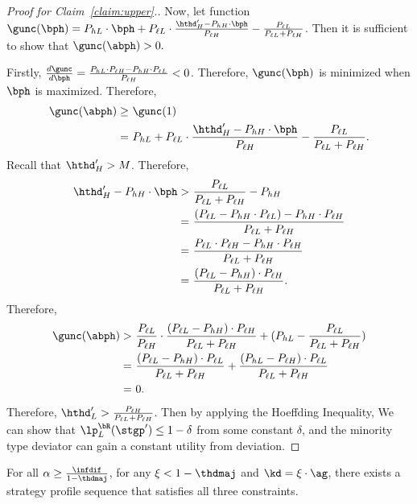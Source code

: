 \begin{proof}[Proof for Claim~\ref{claim:upper}.]
    Now, let function $\gunc(\bph) = P_{hL} \cdot \bph + P_{\ell L}\cdot \frac{\hthd'_H - P_{hH}\cdot \bph}{P_{\ell H}} - \frac{P_{\ell L}}{P_{\ell L} + P_{\ell H}}$. Then it is sufficient to show that $\gunc(\abph) > 0. $

    Firstly, $\frac{d \gunc}{d \bph} = \frac{P_{hL}\cdot P_{\ell H} - P_{hH}\cdot P_{\ell L}}{P_{\ell H}} < 0$. Therefore, $\gunc(\bph)$ is minimized when $\bph$ is maximized. 
    Therefore, 
    \begin{align*}
        \gunc(\abph) \ge &\ \gunc(1)\\
        =&\ P_{hL} + P_{\ell L}\cdot \frac{\hthd'_H - P_{hH}\cdot \bph}{P_{\ell H}} - \frac{P_{\ell L}}{P_{\ell L} + P_{\ell H}}.
    \end{align*}
    Recall that $\hthd'_H > M$. Therefore,  
    \begin{align*}
        \hthd'_H - P_{hH}\cdot \bph > &\ \frac{P_{\ell L}}{P_{\ell L} + P_{\ell H}} - P_{hH}\\
        =&\ \frac{(P_{\ell L} -P_{hH} \cdot P_{\ell L}) - P_{hH}\cdot P_{\ell H}}{P_{\ell L} + P_{\ell H}}\\
        =&\ \frac{P_{\ell L}\cdot P_{\ell H} - P_{hH}\cdot P_{\ell H}}{P_{\ell L} + P_{\ell H}}\\
        =&\ \frac{(P_{\ell L} - P_{hH})\cdot P_{\ell H}}{P_{\ell L} + P_{\ell H}}.
    \end{align*}
    Therefore, 
    \begin{align}
        \gunc(\abph) > &\ \frac{P_{\ell L}}{P_{\ell H}}\cdot \frac{(P_{\ell L} - P_{hH})\cdot P_{\ell H}}{P_{\ell L} + P_{\ell H}} + (P_{hL} - \frac{P_{\ell L}}{P_{\ell L} + P_{\ell H}})\\
        =&\  \frac{(P_{\ell L} - P_{hH})\cdot P_{\ell L}}{P_{\ell L} + P_{\ell H}} + \frac{(P_{h L} - P_{\ell H})\cdot P_{\ell L}}{P_{\ell L} + P_{\ell H}}\\
        =&\ 0. 
    \end{align}
    Therefore, $\hthd'_L > \frac{P_{\ell H}}{P_{\ell L} + P_{\ell H}}$. Then by applying the Hoeffding Inequality, We can show that $\lp_{L}^{\bR}(\stgp') \le 1 - \delta$ from some constant $\delta$, and the minority type deviator can gain a constant utility from deviation. 
\end{proof}

\begin{claim}
\label{claim:lower}
    For all $\alpha \ge \frac{\infdif}{1 - \thdmaj}$, for any $\xi < 1 - \thdmaj$ and $\kd = \xi\cdot \ag$, there exists a strategy profile sequence that satisfies all three constraints. 
\end{claim}

